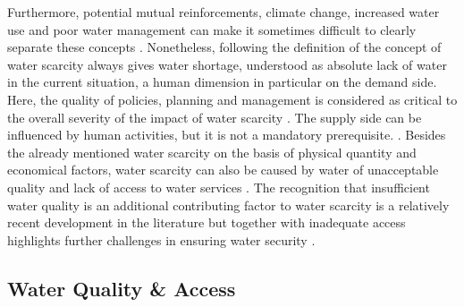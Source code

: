 {Furthermore, potential mutual reinforcements, climate change, increased water use and poor water management can make it sometimes difficult to clearly separate these concepts \autocite{idmpDroughtWaterScarcity2022,lealfilhoUnderstandingResponsesClimaterelated2022,liuWaterScarcityAssessments2017,rcrcFORECASTBASEDFINANCINGEARLY2020}. Nonetheless, following the definition of \autocite{faoCopingWaterScarcity2012} the concept of water scarcity always gives water shortage, understood as absolute lack of water in the current situation, a human dimension in particular on the demand side. Here, the quality of policies, planning and management is considered as critical to the overall severity of the impact of water scarcity \autocite{idmpDroughtWaterScarcity2022,faoCopingWaterScarcity2012,vereintenationenSpecialReportDrought2021}. The supply side can be influenced by human activities, but it is not a mandatory prerequisite. \autocite{idmpDroughtWaterScarcity2022}. 
Besides the already mentioned water scarcity on the basis of physical quantity and economical factors, water scarcity can also be caused by water of unacceptable quality and lack of access to water services \autocite{faoCopingWaterScarcity2012}. The recognition that insufficient water quality is an additional contributing factor to water scarcity is a relatively recent development in the literature \autocite{liuThreedimensionalWaterScarcity2020} but together with inadequate access highlights further challenges in ensuring water security \autocite{caretta2022water, mishraWaterSecurityChanging2021}. 



\subsection{Water Quality \& Access}

}
